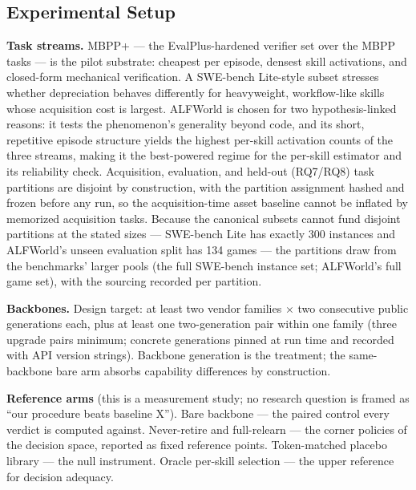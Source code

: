\documentclass[11pt]{article}
\begin{document}
\subsection{Experimental Setup}

\textbf{Task streams.} MBPP+ --- the EvalPlus-hardened verifier set \citep{EvalPlus2023} over the MBPP tasks \citep{MBPP2021} --- is the pilot substrate: cheapest per episode, densest skill activations, and closed-form mechanical verification. A SWE-bench Lite-style subset \citep{SWEbench2024} stresses whether depreciation behaves differently for heavyweight, workflow-like skills whose acquisition cost is largest. ALFWorld \citep{ALFWorld2021} is chosen for two hypothesis-linked reasons: it tests the phenomenon's generality beyond code, and its short, repetitive episode structure yields the highest per-skill activation counts of the three streams, making it the best-powered regime for the per-skill estimator and its reliability check. Acquisition, evaluation, and held-out (RQ7/RQ8) task partitions are disjoint by construction, with the partition assignment hashed and frozen before any run, so the acquisition-time asset baseline cannot be inflated by memorized acquisition tasks. Because the canonical subsets cannot fund disjoint partitions at the stated sizes --- SWE-bench Lite has exactly 300 instances and ALFWorld's unseen evaluation split has 134 games --- the partitions draw from the benchmarks' larger pools (the full SWE-bench instance set; ALFWorld's full game set), with the sourcing recorded per partition.

\textbf{Backbones.} Design target: at least two vendor families $\times$ two consecutive public generations each, plus at least one two-generation pair within one family (three upgrade pairs minimum; concrete generations pinned at run time and recorded with API version strings). Backbone generation is the treatment; the same-backbone bare arm absorbs capability differences by construction.

\textbf{Reference arms} (this is a measurement study; no research question is framed as ``our procedure beats baseline X''). Bare backbone --- the paired control every verdict is computed against. Never-retire and full-relearn --- the corner policies of the decision space, reported as fixed reference points. Token-matched placebo library --- the null instrument. Oracle per-skill selection --- the upper reference for decision adequacy.
\end{document}

